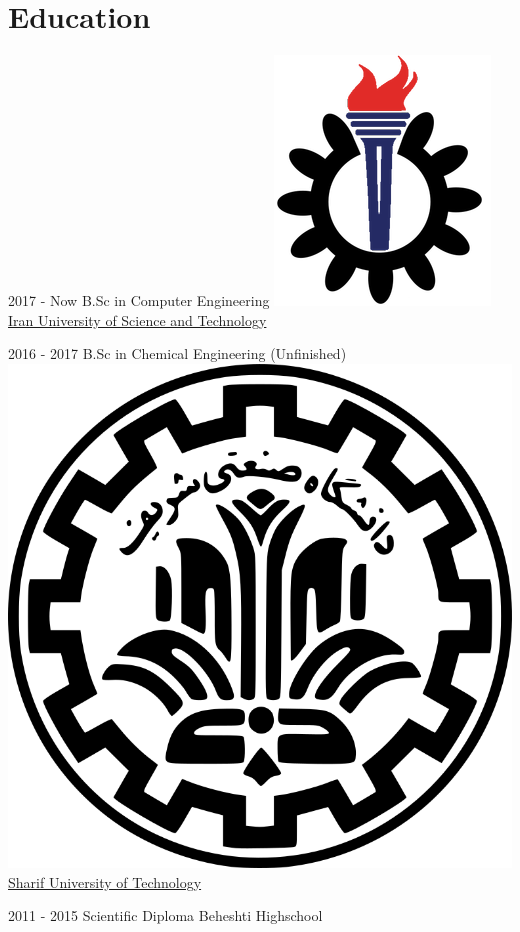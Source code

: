 \documentclass[a4paper]{./classes/friggeri-cv}
\begin{document}
    \section{Education}\label{sec:education}
    \begin{entrylist}
        \entry
        {2017 - Now}
        {     B.Sc in Computer Engineering}
        {\href{http://www.iust.ac.ir/}{\includegraphics[scale=0.08]{../assets/images/logos/IUST_logo_color.png}Iran University of Science and Technology}}
        {}

        \entry
        {2016 - 2017}
        {    B.Sc in Chemical Engineering (Unfinished)}
        {\href{http://www.sharif.ir/}{\includegraphics[scale=0.015]{../assets/images/logos/Sharif_logo.png} Sharif University of Technology}}
        {}

        \entry
        {2011 - 2015}
        {    Scientific Diploma}
        {Beheshti Highschool}
        {}
    \end{entrylist}
\end{document}
